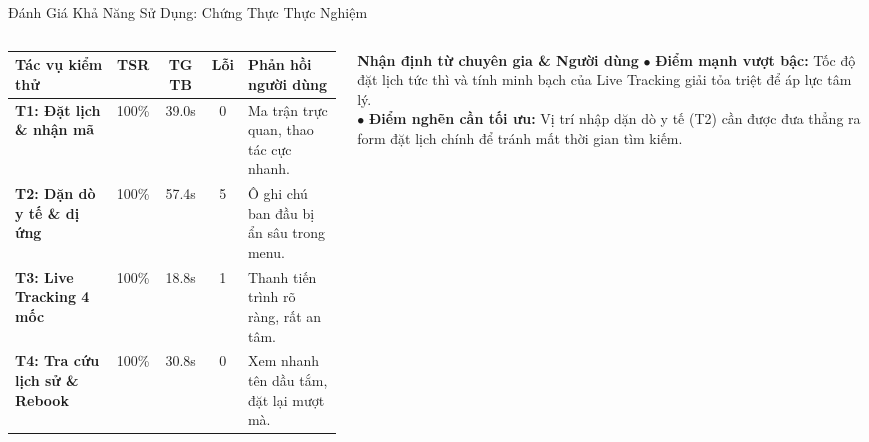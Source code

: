 \begin{frame}{Đánh Giá Khả Năng Sử Dụng: Chứng Thực Thực Nghiệm}
  \vspace{1.5mm}

  \begin{columns}[T]
    \begin{column}{0.62\textwidth}
      \begin{table}
        \centering
        \tiny
        \renewcommand{\arraystretch}{1.15}
        \begin{tabularx}{\textwidth}{|l|c|c|c|X|}
          \hline
          \rowcolor{PetcarePrimary!15}
          \textbf{Tác vụ kiểm thử} & \textbf{TSR} & \textbf{TG TB} & \textbf{Lỗi} & \textbf{Phản hồi người dùng} \\ \hline
          \textbf{T1: Đặt lịch \& nhận mã} & 100\% & 39.0s & 0 & Ma trận trực quan, thao tác cực nhanh. \\ \hline
          \textbf{T2: Dặn dò y tế \& dị ứng} & 100\% & 57.4s & 5 & Ô ghi chú ban đầu bị ẩn sâu trong menu. \\ \hline
          \textbf{T3: Live Tracking 4 mốc} & 100\% & 18.8s & 1 & Thanh tiến trình rõ ràng, rất an tâm. \\ \hline
          \textbf{T4: Tra cứu lịch sử \& Rebook} & 100\% & 30.8s & 0 & Xem nhanh tên dầu tắm, đặt lại mượt mà. \\ \hline
        \end{tabularx}
      \end{table}
    \end{column}

    \begin{column}{0.36\textwidth}
      \begin{exampleblock}{\scriptsize \textbf{Nhận định từ chuyên gia \& Người dùng}}
        \tiny
        $\bullet$ \textbf{Điểm mạnh vượt bậc:} Tốc độ đặt lịch tức thì và tính minh bạch của Live Tracking giải tỏa triệt để áp lực tâm lý.\\
        $\bullet$ \textbf{Điểm nghẽn cần tối ưu:} Vị trí nhập dặn dò y tế (T2) cần được đưa thẳng ra form đặt lịch chính để tránh mất thời gian tìm kiếm.
      \end{exampleblock}
    \end{column}
  \end{columns}
\end{frame}
